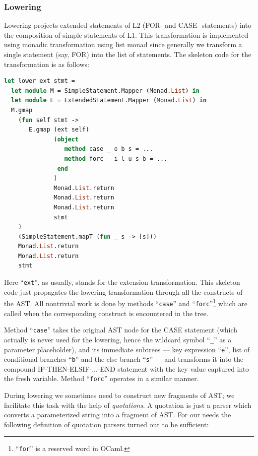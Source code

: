 \subsubsection{Lowering}

Lowering projects extended statements of L2 (FOR- and CASE- statements) into the composition
of simple statements of L1. This transformation is implemented using monadic transformation
using list monad since generally we transform a single statement (say, FOR) into the list
of statements. The skeleton code for the transformation is as follows:

\begin{lstlisting}[language=ocaml]
let lower ext stmt =
  let module M = SimpleStatement.Mapper (Monad.List) in 
  let module E = ExtendedStatement.Mapper (Monad.List) in
  M.gmap 
    (fun self stmt ->
       E.gmap (ext self)
              (object
                 method case _ e b s = ...
                 method forc _ i l u s b = ...
               end
              ) 
              Monad.List.return 
              Monad.List.return 
              Monad.List.return 
              stmt
    )
    (SimpleStatement.mapT (fun _ s -> [s])) 
    Monad.List.return 
    Monad.List.return
    stmt
\end{lstlisting}

Here ``\lstinline{ext}'', as usually, stands for the extension transformation. This skeleton
code just propagates the lowering transformation through all the constructs of the AST. All
nontrivial work is done by methods ``\lstinline{case}'' and 
``\lstinline{forc}''\footnote{``\lstinline{for}'' is a reserved word in OCaml.} which are 
called when the corresponding construct is encountered in the tree.

Method ``\lstinline{case}'' takes the original AST node for the CASE statement 
(which actually is never used for the lowering, hence the wildcard symbol ``\lstinline{_}'' 
as a parameter placeholder), and its immediate subtrees --- key expression ``\lstinline{e}'',
list of conditional branches ``\lstinline{b}'' and the else branch ``\lstinline{s}'' --- and transforms it 
into the compound \mbox{IF-THEN-ELSIF-...-END} statement with the key value captured into the fresh variable.
Method ``\lstinline{forc}'' operates in a similar manner.

During lowering we sometimes need to construct new fragments of AST; we facilitate this task
with the help of \emph{quotations}. A quotation is just a parser which converts a parameterized 
string into a fragment of AST. For our needs the following definition of quotation parsers turned out 
to be sufficient:

